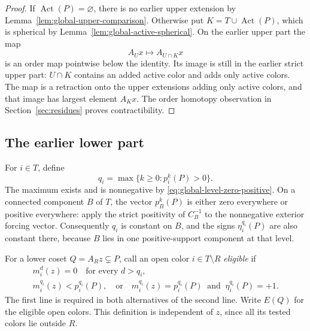 \begin{proof}
If $\operatorname{Act}(P)=\varnothing$, there is no earlier upper
extension by Lemma~\ref{lem:global-upper-comparison}.  Otherwise put
$K=T\cup\operatorname{Act}(P)$, which is spherical by
Lemma~\ref{lem:global-active-spherical}.  On the earlier upper part the
map
\[
 A_Ux\longmapsto A_{U\cap K}x
\]
is an order map pointwise below the identity.  Its image is still in the
earlier strict upper part: $U\cap K$ contains an added active color and
adds only active colors.  The map is a retraction onto the upper
extensions adding only active colors, and that image has largest element
$A_Kx$.  The order homotopy observation in Section~\ref{sec:residues}
proves contractibility.
\end{proof}

\subsection{The earlier lower part}

For $i\in T$, define
\begin{equation}\label{eq:global-prescribed-top}
 q_i=\max\{k\ge0:p_i^k(P)>0\}.
\end{equation}
The maximum exists and is nonnegative by
\eqref{eq:global-level-zero-positive}.  On a connected component $B$ of
$T$, the vector $p_B^k(P)$ is either zero everywhere or positive
everywhere: apply the strict positivity of $C_B^{-1}$ to the nonnegative
exterior forcing vector.  Consequently $q_i$ is constant on $B$, and
the signs $\eta_i^{q_i}(P)$ are also constant there, because $B$ lies in
one positive-support component at that level.

\begin{definition}\label{def:global-eligible}
For a lower coset $Q=A_Rz\subsetneq P$, call an open color
$i\in T\setminus R$ \emph{eligible} if
\begin{equation}\label{eq:global-eligibility}
 \begin{gathered}
 m_i^d(z)=0\quad\text{for every }d>q_i,\\
 m_i^{q_i}(z)<p_i^{q_i}(P),
 \quad\text{or}\quad
 m_i^{q_i}(z)=p_i^{q_i}(P)
       \ \text{ and }\ \eta_i^{q_i}(P)=+1.
 \end{gathered}
\end{equation}
The first line is required in both alternatives of the second line.
Write $E(Q)$ for the eligible open colors.  This definition is
independent of $z$, since all its tested colors lie outside $R$.
\end{definition}

